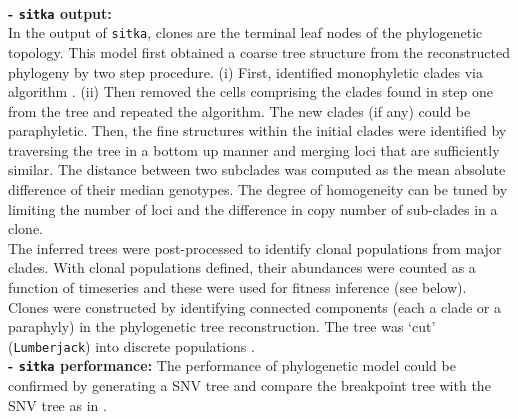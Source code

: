 \\
\textbf{- \texttt{sitka} \textbf{output:} }
\\
In the output of \texttt{sitka}, clones are the terminal leaf nodes of the phylogenetic topology.  
This model first obtained a coarse tree structure from the reconstructed phylogeny by two step procedure. (i) First, identified  monophyletic clades via algorithm \cite{salehi2020single}.
(ii) Then removed the cells comprising the clades found in step one from the tree and repeated the algorithm. The new clades (if any) could be paraphyletic. Then, the fine structures within the initial clades were identified by traversing the tree in a bottom up manner and merging loci that are sufficiently similar.
The distance between two subclades was computed as the mean absolute difference of their median genotypes.
The degree of homogeneity can be tuned by limiting the number of loci and the difference in copy number of sub-clades in a clone. 
\\
The inferred trees were post-processed to identify clonal populations from major clades. With clonal populations defined, their abundances were counted as a function of timeseries and these were used for fitness inference (see below). 
\\
Clones were constructed by identifying connected components (each a clade or a paraphyly) in the phylogenetic tree reconstruction. The tree was `cut' (\texttt{Lumberjack}) into discrete populations  \cite{salehi2020single}.
\\
\textbf{- \texttt{sitka} \textbf{performance:} }
The performance of phylogenetic model could be confirmed by generating a SNV tree and compare the breakpoint tree with the SNV tree as in \cite{laks2019clonal}. 








